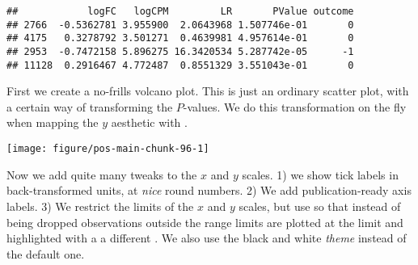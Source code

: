 \documentclass[krantz2]{krantz}\usepackage{knitr}%
\begin{document}
\begin{knitrout}\footnotesize
{}\color{fgcolor}\begin{kframe}
\begin{alltt}
 \hlstd{)}
\end{alltt}
\begin{verbatim}
##            logFC   logCPM         LR       PValue outcome
## 2766  -0.5362781 3.955900  2.0643968 1.507746e-01       0
## 4175   0.3278792 3.501271  0.4639981 4.957614e-01       0
## 2953  -0.7472158 5.896275 16.3420534 5.287742e-05      -1
## 11128  0.2916467 4.772487  0.8551329 3.551043e-01       0
\end{verbatim}
\end{kframe}
\end{knitrout}

First we create a no-frills volcano plot. This is just an ordinary scatter plot, with a certain way of transforming the $P$-values. We do this transformation on the fly when mapping the $y$ aesthetic with .

\begin{knitrout}\footnotesize
{}\color{fgcolor}\begin{kframe}
\begin{alltt}
\hlstd{(} 
         \hlstd{(} 
              \hlstd{=} \hlopt{-}
              \hlstd{=}  \hlopt{+}
    \hlstd{()} \hlopt{+}
    \hlstd{(} \hlstd{=} \hlstd{(}\hlstd{,} \hlstd{,} \hlstd{),}  \hlstd{=} \hlstd{)}
\end{alltt}
\end{kframe}

{\centering \texttt{[image: figure/pos-main-chunk-96-1]} 

}



\end{knitrout}

Now we add quite many tweaks to the $x$ and $y$ scales. 1) we show tick labels in back-transformed units, at \emph{nice} round numbers. 2) We add publication-ready axis labels. 3) We restrict the limits of the $x$ and $y$ scales, but use  so that instead of being dropped observations outside the range limits are plotted at the limit and highlighted with a a different . We also use the black and white \emph{theme} instead of the default one.
\end{document}
